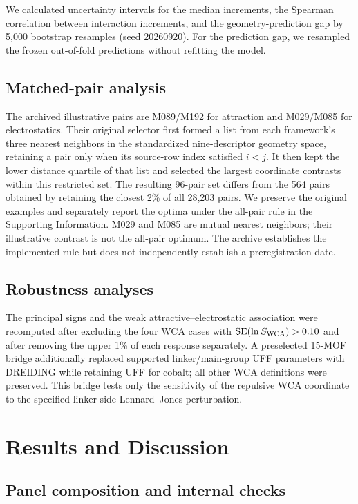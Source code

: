 \documentclass[journal=jctcce,manuscript=article]{achemso}
\begin{document}
We calculated uncertainty intervals for the median increments, the Spearman correlation between interaction increments, and the geometry-prediction gap by 5,000 bootstrap resamples (seed 20260920). For the prediction gap, we resampled the frozen out-of-fold predictions without refitting the model.


\subsection{Matched-pair analysis}


The archived illustrative pairs are M089/M192 for attraction and M029/M085 for electrostatics. Their original selector first formed a list from each framework's three nearest neighbors in the standardized nine-descriptor geometry space, retaining a pair only when its source-row index satisfied $i<j$. It then kept the lower distance quartile of that list and selected the largest coordinate contrasts within this restricted set. The resulting 96-pair set differs from the 564 pairs obtained by retaining the closest 2\% of all 28,203 pairs. We preserve the original examples and separately report the optima under the all-pair rule in the Supporting Information. M029 and M085 are mutual nearest neighbors; their illustrative contrast is not the all-pair optimum. The archive establishes the implemented rule but does not independently establish a preregistration date.


\subsection{Robustness analyses}


The principal signs and the weak attractive--electrostatic association were recomputed after excluding the four WCA cases with $\mathrm{SE}(\ln S_{\rm WCA})>0.10$ and after removing the upper 1\% of each response separately. A preselected 15-MOF bridge additionally replaced supported linker/main-group UFF parameters with DREIDING while retaining UFF for cobalt; all other WCA definitions were preserved. This bridge tests only the sensitivity of the repulsive WCA coordinate to the specified linker-side Lennard--Jones perturbation.

\section{Results and Discussion}
\subsection{Panel composition and internal checks}
\end{document}
